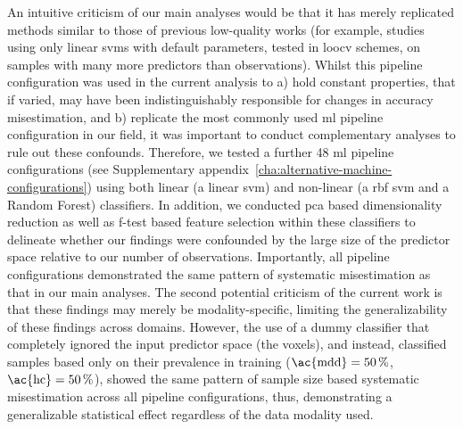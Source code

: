 \documentclass[12pt,a4paper]{article}
\begin{document}
An intuitive criticism of our main analyses would be that it has merely replicated methods similar to those of previous low-quality works (for example, studies using only linear \acp{svm} with default parameters, tested in \ac{loocv} schemes, on samples with many more predictors than observations). Whilst this pipeline configuration was used in the current analysis to a) hold constant properties, that if varied, may have been indistinguishably responsible for changes in accuracy misestimation, and b) replicate the most commonly used \ac{ml} pipeline configuration in our field, it was important to conduct complementary analyses to rule out these confounds. Therefore, we tested a further \num{48} \ac{ml} pipeline configurations (see Supplementary appendix~\ref{cha:alternative-machine-configurations}) using both linear (a linear \ac{svm}) and non-linear (a \ac{rbf} \ac{svm} and a Random Forest) classifiers. In addition, we conducted \ac{pca} based dimensionality reduction as well as f-test based feature selection within these classifiers to delineate whether our findings were confounded by the large size of the predictor space relative to our number of observations. Importantly, all pipeline configurations demonstrated the same pattern of systematic misestimation as that in our main analyses. The second potential criticism of the current work is that these findings may merely be modality-specific, limiting the generalizability of these findings across domains. However, the use of a dummy classifier that completely ignored the input predictor space (the voxels), and instead, classified samples based only on their prevalence in training ($\text{\ac{mdd}}=\SI{50}{\percent}$, $\text{\ac{hc}}=\SI{50}{\percent}$), showed the same pattern of sample size based systematic misestimation across all pipeline configurations, thus, demonstrating a generalizable statistical effect regardless of the data modality used.
\end{document}
